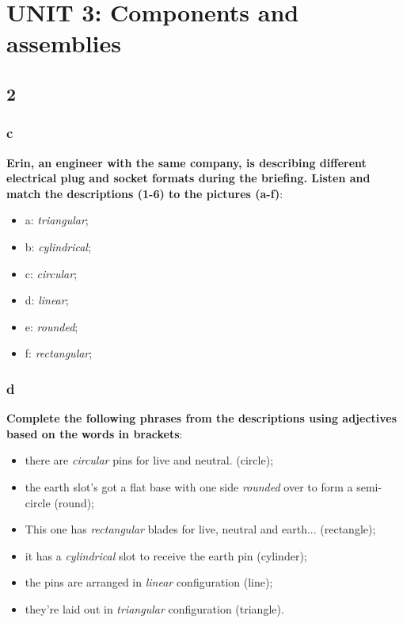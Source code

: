 \section{UNIT 3: Components and assemblies}

\subsection{2}

\subsubsection{c}

\textbf{Erin, an engineer with the same company, is describing different electrical plug and socket formats during the briefing. Listen and match the descriptions (1-6) to the pictures (a-f)}:

\begin{itemize}

\item a: \textit{triangular};
\item b: \textit{cylindrical};
\item c: \textit{circular};
\item d: \textit{linear};
\item e: \textit{rounded};
\item f: \textit{rectangular};

\end{itemize}

\subsubsection{d}

\textbf{Complete the following phrases from the descriptions using adjectives based on the words in brackets}:

\begin{itemize}

\item there are \textit{circular} pins for live and neutral. (circle);
\item  the earth slot's got a flat base with one side \textit{rounded} over to form a semi-circle (round);
\item This one has \textit{rectangular} blades for live, neutral and earth... (rectangle);
\item it has a \textit{cylindrical} slot to receive the earth pin (cylinder);
\item the pins are arranged in \textit{linear} configuration (line);
\item they're laid out in \textit{triangular} configuration (triangle).

\end{itemize}

